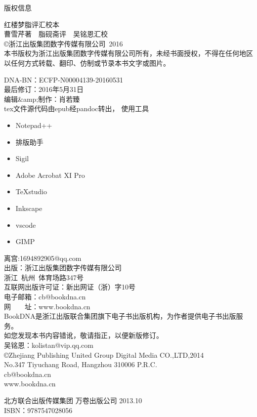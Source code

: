 

\begin{flushleft}
{\Huge \heiti 版权信息}

	
{红楼梦脂评汇校本}\\
曹雪芹著~~脂砚斋评~~吴铭恩汇校\\[2\baselineskip]\copyright 浙江出版集团数字传媒有限公司~2016\\
本书版权为浙江出版集团数字传媒有限公司所有，未经书面授权，不得在任何地区以任何方式转载、翻印、仿制或节录本书文字或图片。

DNA-BN：ECFP-N00004139-20160531\\
最后修订：2016年5月31日\\
编辑\&amp;制作：{肖若臻}\\

tex文件源代码由epub经pandoc转出，
使用工具
\begin{itemize}
	\item Notepad++
	\item 排版助手
	\item Sigil
	\item Adobe Acrobat XI Pro
	\item TeXstudio
	\item Inkscape
	\item vscode
	\item GIMP
\end{itemize}
离宫:1694892905@qq.com\\

出版：浙江出版集团数字传媒有限公司\\
浙江~杭州~体育场路347号\\
互联网出版许可证：新出网证（浙）字10号\\
电子邮箱：cb@bookdna.cn\\
网　　址：www.bookdna.cn\\
BookDNA是浙江出版联合集团旗下电子书出版机构，为作者提供电子书出版服务。\\
如您发现本书内容错讹，敬请指正，以便新版修订。\\
吴铭恩：kolistan@vip.qq.com\\

\copyright Zhejiang Publishing United Group Digital Media CO.,LTD,2014\\
No.347 Tiyuchang Road, Hangzhou 310006 P.R.C.\\
cb@bookdna.cn\\
www.bookdna.cn

北方联合出版传媒集团 万卷出版公司 2013.10\\
ISBN：9787547028056
\end{flushleft}
